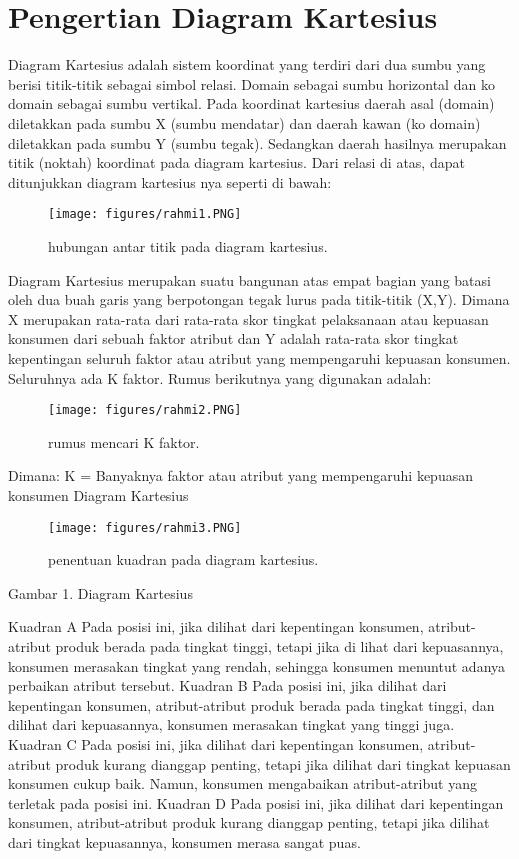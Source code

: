 
\section{Pengertian Diagram Kartesius}
Diagram Kartesius adalah sistem koordinat yang terdiri dari dua sumbu yang berisi titik-titik sebagai simbol relasi.
Domain sebagai sumbu horizontal dan ko domain sebagai sumbu vertikal.
Pada koordinat kartesius daerah asal (domain) diletakkan pada sumbu X (sumbu mendatar) dan daerah kawan (ko domain) diletakkan pada sumbu Y (sumbu tegak).
Sedangkan daerah hasilnya merupakan titik (noktah) koordinat pada diagram kartesius. Dari relasi di atas, dapat ditunjukkan diagram kartesius nya seperti di bawah:
\begin{figure}[ht]
	\centerline{\texttt{[image: figures/rahmi1.PNG]}}
	\caption{hubungan antar titik pada diagram kartesius.}
	\label{rahmi1}
	\end{figure}

Diagram Kartesius merupakan suatu bangunan atas empat bagian yang batasi oleh dua buah garis yang berpotongan tegak lurus pada titik-titik (X,Y). 
Dimana X merupakan rata-rata dari rata-rata skor tingkat pelaksanaan atau kepuasan konsumen dari sebuah faktor atribut 
dan Y adalah rata-rata skor tingkat kepentingan seluruh faktor atau atribut yang mempengaruhi kepuasan konsumen.
Seluruhnya ada K faktor. Rumus berikutnya yang digunakan adalah:
\begin{figure}[ht]
	\centerline{\texttt{[image: figures/rahmi2.PNG]}}
	\caption{rumus mencari K faktor.}
	\label{rahmi2}
	\end{figure}

Dimana: K = Banyaknya faktor atau atribut yang mempengaruhi kepuasan konsumen 
Diagram Kartesius	
\begin{figure}[ht]
	\centerline{\texttt{[image: figures/rahmi3.PNG]}}
	\caption{penentuan kuadran pada diagram kartesius.}
	\label{rahmi3}
	\end{figure}

Gambar 1. Diagram Kartesius



Kuadran A
Pada posisi ini, jika dilihat dari kepentingan konsumen, atribut-atribut produk berada pada tingkat tinggi, tetapi jika di lihat dari kepuasannya, 
konsumen merasakan tingkat yang rendah, sehingga konsumen menuntut adanya perbaikan atribut tersebut.
Kuadran B
Pada posisi ini, jika dilihat dari kepentingan konsumen, atribut-atribut produk berada pada tingkat tinggi, dan dilihat dari kepuasannya, 
konsumen merasakan tingkat yang tinggi juga.
Kuadran C
Pada posisi ini, jika dilihat dari kepentingan konsumen, atribut-atribut produk kurang dianggap penting, tetapi jika dilihat dari tingkat kepuasan konsumen cukup baik.
Namun, konsumen mengabaikan atribut-atribut yang terletak pada posisi ini.
Kuadran D
Pada posisi ini, jika dilihat dari kepentingan konsumen, atribut-atribut produk kurang dianggap penting, tetapi jika dilihat dari tingkat kepuasannya, konsumen merasa
sangat puas.


